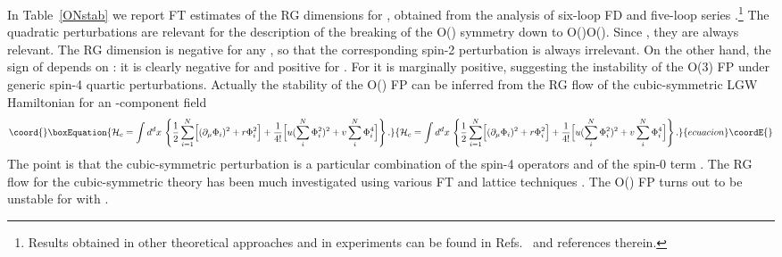 \documentclass[a4paper,12pt]{article}
\begin{document}
In Table~\ref{ONstab} we report FT estimates of 
the RG dimensions \coordHE{}
for \coordHE{}, obtained from the analysis of six-loop FD
and five-loop \myHighlight{$\epsilon$}\coordHE{} series 
\cite{CPV-02,CPV-02-mc,GZ-98}.\footnote{Results obtained in 
other theoretical approaches and in experiments  
can be found in Refs.~\cite{CPV-02-mc,review} and references therein.}
The quadratic perturbations \coordHE{} are relevant for the description of 
the breaking of the O(\coordHE{}) symmetry down to O(\coordHE{})\myHighlight{$\oplus$}\coordHE{}O(\coordHE{}).
Since \coordHE{}, they are always relevant.
The RG dimension \coordHE{} is negative for any \coordHE{}, so that the corresponding
spin-2 perturbation \coordHE{} is always irrelevant.
On the other hand, the sign of \coordHE{} depends on \coordHE{}:
it is clearly negative for \coordHE{} and positive for \coordHE{}.
For \coordHE{} it is marginally positive, suggesting the instability
of the O(3) FP under generic spin-4 quartic perturbations.
Actually the stability of the O(\coordHE{}) FP 
can be inferred from the RG flow of the cubic-symmetric LGW Hamiltonian
for an \coordHE{}-component field
\begin{equation}\coord{}\boxEquation{
{\cal H}_{c} =  \int d^d x\, \left\{ {1\over 2} \sum_{i=1}^{N}
      \Bigl[ (\partial_\mu \Phi_i)^2 +  r \Phi_i^2 \Bigr]  
+{1\over 4!} \Bigl[ u (\sum_i^N \Phi_i^2)^2 + v \sum_i^N \Phi_i^4 \Bigr]
\right \} .
\label{Hphi4cubic}
}{
{\cal H}_{c} =  \int d^d x\, \left\{ {1\over 2} \sum_{i=1}^{N}
      \Bigl[ (\partial_\mu \Phi_i)^2 +  r \Phi_i^2 \Bigr]  
+{1\over 4!} \Bigl[ u (\sum_i^N \Phi_i^2)^2 + v \sum_i^N \Phi_i^4 \Bigr]
\right \} .
}{ecuacion}\coordE{}\end{equation}
The point is that the cubic-symmetric 
perturbation \coordHE{}
is a particular combination of the spin-4 operators \coordHE{} and 
of the spin-0 term \coordHE{}.  
The RG flow for the cubic-symmetric theory has been much investigated
using various FT and lattice techniques \cite{review}. 
The O(\coordHE{}) FP turns out to be unstable for \coordHE{} with \coordHE{}.
\end{document}
